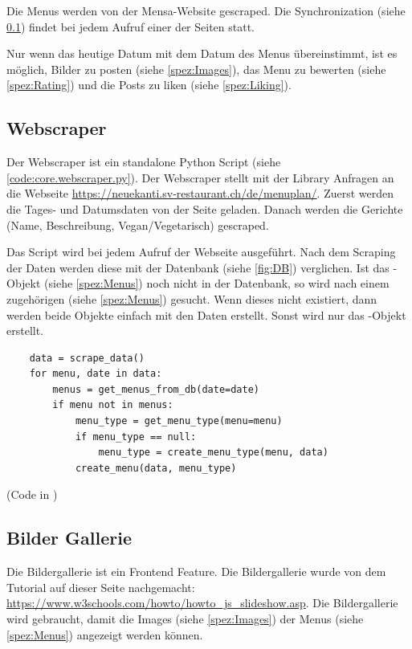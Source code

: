 Die Menus werden von der Mensa-Website gescraped. Die Synchronization (siehe
\ref{spez:Webscraper}) findet bei jedem Aufruf einer der Seiten statt.

Nur wenn das heutige Datum mit dem Datum des Menus übereinstimmt, ist es
möglich, Bilder zu posten (siehe \ref{spez:Images}), das Menu zu bewerten (siehe
\ref{spez:Rating}) und die Posts zu liken (siehe \ref{spez:Liking}).

\subsection{Webscraper} \label{spez:Webscraper}

Der Webscraper ist ein standalone Python Script (siehe
\ref{code:core.webscraper.py}). Der Webscraper stellt mit der Library
 Anfragen an die Webseite
\url{https://neuekanti.sv-restaurant.ch/de/menuplan/}. Zuerst werden die Tages-
und Datumsdaten von der Seite geladen. Danach werden die Gerichte (Name,
Beschreibung, Vegan/Vegetarisch) gescraped.


Das Script wird bei jedem Aufruf der Webseite ausgeführt. Nach dem Scraping
der Daten werden diese mit der Datenbank (siehe \ref{fig:DB}) verglichen.
Ist das -Objekt (siehe \ref{spez:Menus}) noch nicht in der Datenbank,
so wird nach einem zugehörigen  (siehe \ref{spez:Menus})
gesucht. Wenn dieses nicht existiert, dann werden beide Objekte einfach mit den
Daten erstellt. Sonst wird nur das -Objekt erstellt.

\newpage

\begin{lstlisting}
    data = scrape_data()
    for menu, date in data:
        menus = get_menus_from_db(date=date)
        if menu not in menus:
            menu_type = get_menu_type(menu=menu)
            if menu_type == null:
                menu_type = create_menu_type(menu, data)
            create_menu(data, menu_type)
\end{lstlisting}

(Code in )

\subsection{Bilder Gallerie} \label{spez:Gallerie}

Die Bildergallerie ist ein Frontend Feature. Die Bildergallerie wurde von dem
Tutorial auf dieser Seite nachgemacht:
\url{https://www.w3schools.com/howto/howto_js_slideshow.asp}. Die Bildergallerie
wird gebraucht, damit die Images (siehe \ref{spez:Images}) der Menus (siehe
\ref{spez:Menus}) angezeigt werden können.

